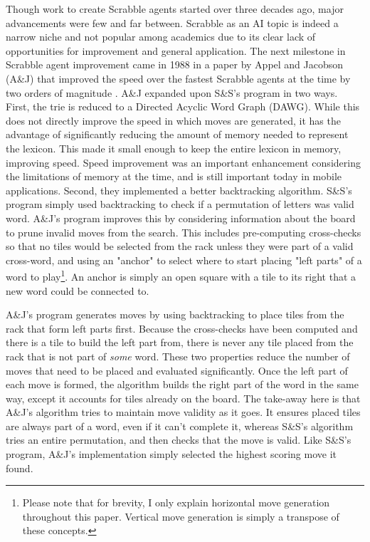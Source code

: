 \documentclass[letterpaper]{article}
\begin{document}
Though work to create Scrabble agents started over three decades ago, major advancements were few and far between. Scrabble as an AI topic is indeed a narrow niche and not popular among academics due to its clear lack of opportunities for improvement and general application. The next milestone in Scrabble agent improvement came in 1988 in a paper by Appel and Jacobson (A\&J) that improved the speed over the fastest Scrabble agents at the time by two orders of magnitude \cite{Appel1988}. A\&J expanded upon S\&S's program in two ways. First, the trie is reduced to a Directed Acyclic Word Graph (DAWG). While this does not directly improve the speed in which moves are generated, it has the advantage of significantly reducing the amount of memory needed to represent the lexicon. This made it small enough to keep the entire lexicon in memory, improving speed. Speed improvement was an important enhancement considering the limitations of memory at the time, and is still important today in mobile applications. Second, they implemented a better backtracking algorithm. S\&S's program simply used backtracking to check if a permutation of letters was valid word. A\&J's program improves this by considering information about the board to prune invalid moves from the search. This includes pre-computing cross-checks so that no tiles would be selected from the rack unless they were part of a valid cross-word, and using an "anchor" to select where to start placing "left parts" of a word to play\footnote{Please note that for brevity, I only explain horizontal move generation throughout this paper. Vertical move generation is simply a transpose of these concepts.}. An anchor is simply an open square with a tile to its right that a new word could be connected to.

A\&J's program generates moves by using backtracking to place tiles from the rack that form left parts first. Because the cross-checks have been computed and there is a tile to build the left part from, there is never any tile placed from the rack that is not part of \emph{some} word. These two properties reduce the number of moves that need to be placed and evaluated significantly. Once the left part of each move is formed, the algorithm builds the right part of the word in the same way, except it accounts for tiles already on the board. The take-away here is that A\&J's algorithm tries to maintain move validity as it goes. It ensures placed tiles are always part of a word, even if it can't complete it, whereas S\&S's algorithm tries an entire permutation, and then checks that the move is valid. Like S\&S's program, A\&J's implementation simply selected the highest scoring move it found.
\end{document}
